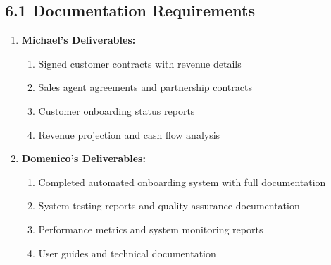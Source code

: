 \subsection*{6.1 Documentation Requirements}
\begin{enumerate}[label=\arabic*.]
\item \textbf{Michael's Deliverables:}
    \begin{enumerate}[label=(\alph*)]
    \item Signed customer contracts with revenue details
    \item Sales agent agreements and partnership contracts
    \item Customer onboarding status reports
    \item Revenue projection and cash flow analysis
    \end{enumerate}

\item \textbf{Domenico's Deliverables:}
    \begin{enumerate}[label=(\alph*)]
    \item Completed automated onboarding system with full documentation
    \item System testing reports and quality assurance documentation
    \item Performance metrics and system monitoring reports
    \item User guides and technical documentation
    \end{enumerate}
\end{enumerate}

